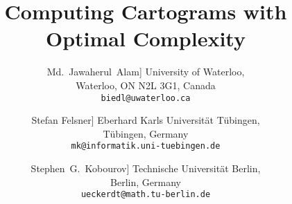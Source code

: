\documentclass[11pt]{article}
\begin{document}
\addtocounter{page}{-1}

\title{\LARGE\bf Computing Cartograms with Optimal Complexity}


\author{
      \large Md.~Jawaherul~Alam\+1mm]
\sf    University of Waterloo,\\
      \sf    Waterloo, ON N2L 3G1, Canada\\
        {\tt biedl@uwaterloo.ca}
\and
      \large Stefan Felsner\+1mm]
\sf    Eberhard Karls Universit\"at T\"ubingen,\\
      \sf    T\"ubingen, Germany\\
        {\tt mk@informatik.uni-tuebingen.de}
\and
      \large Stephen~G.~Kobourov\+1mm]
\sf    Technische Universit\"at Berlin,\\
      \sf    Berlin, Germany\\
        {\tt ueckerdt@math.tu-berlin.de}
}
\date{}
\end{document}
